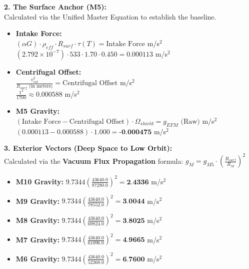 \documentclass[11pt, a4paper]{article}
\begin{document}
\vspace{1.0em}
  \noindent \textbf{2. The Surface Anchor (M5):} \\
  \hspace*{1em} Calculated via the Unified Master Equation to establish the baseline.
  \begin{itemize}
    \item \textbf{Intake Force:} \\[0.5em]
    \hspace*{2em} $(\alpha G) \cdot \rho_{eff} \cdot R_{surf} \cdot \tau(T) = \text{Intake Force}$ m/s$^2$ \\[1em]
    \hspace*{2em} $(2.792 \times 10^{-7}) \cdot 533 \cdot 1.70 \cdot 0.450 = 0.000113$ m/s$^2$
    
    \item \textbf{Centrifugal Offset:} \\[0.5em]
    \hspace*{2em} $\frac{v_{rot}^2}{R_{surf} \text{ (in meters)}} = \text{Centrifugal Offset}$ m/s$^2$ \\[1em]
    \hspace*{2em} $\frac{1^2}{1700} \approx 0.000588$ m/s$^2$
    
    \item \textbf{M5 Gravity:} \\[0.5em]
    \hspace*{2em} $(\text{Intake Force} - \text{Centrifugal Offset}) \cdot \Omega_{shield} = g_{EFM} \text{ (Raw)}$ m/s$^2$ \\[1em]
    \hspace*{2em} $(0.000113 - 0.000588) \cdot 1.000 = \textbf{-0.000475}$ m/s$^2$
  \end{itemize}

  \clearpage
  \noindent \textbf{3. Exterior Vectors (Deep Space to Low Orbit):} \\
  \hspace*{1em} Calculated via the \textbf{Vacuum Flux Propagation} formula: $g_M = g_{M5} \cdot \left( \frac{R_{surf}}{R_M} \right)^2$
  \begin{itemize}
    \item \textbf{M10 Gravity:} $9.7344 \left( \frac{43640.0}{87280.0} \right)^2 = \textbf{2.4336}$ m/s$^2$
    \item \textbf{M9 Gravity:} $9.7344 \left( \frac{43640.0}{78552.0} \right)^2 = \textbf{3.0044}$ m/s$^2$
    \item \textbf{M8 Gravity:} $9.7344 \left( \frac{43640.0}{69824.0} \right)^2 = \textbf{3.8025}$ m/s$^2$
    \item \textbf{M7 Gravity:} $9.7344 \left( \frac{43640.0}{61096.0} \right)^2 = \textbf{4.9665}$ m/s$^2$
    \item \textbf{M6 Gravity:} $9.7344 \left( \frac{43640.0}{52368.0} \right)^2 = \textbf{6.7600}$ m/s$^2$
  \end{itemize}
\end{document}

